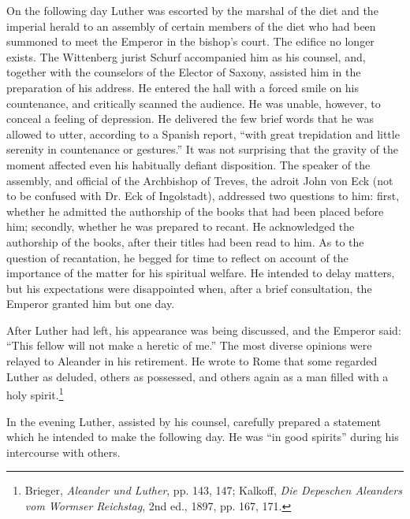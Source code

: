 On the following day Luther was escorted by the marshal of the
diet and the imperial herald to an assembly of certain members of
the diet who had been summoned to meet the Emperor in the bishop’s
court. The edifice no longer exists. The Wittenberg jurist Schurf
accompanied him as his counsel, and, together with the counselors
of the Elector of Saxony, assisted him in the preparation of his address.
He entered the hall with a forced smile on his countenance,
and critically scanned the audience. He was unable, however, to
conceal a feeling of depression. He delivered the few brief words
that he was allowed to utter, according to a Spanish report, “with
great trepidation and little serenity in countenance or gestures.”
It was not surprising that the gravity of the moment affected even
his habitually defiant disposition. The speaker of the assembly, and
official of the Archbishop of Treves, the adroit John von Eck (not
to be confused with Dr. Eck of Ingolstadt), addressed two questions to
him: first, whether he admitted the authorship of the books
that had been placed before him; secondly, whether he was prepared to recant.
He acknowledged the authorship of the books, after
their titles had been read to him. As to the question of recantation,
he begged for time to reflect on account of the importance of the
matter for his spiritual welfare. He intended to delay matters, but
his expectations were disappointed when, after a brief consultation,
the Emperor granted him but one day.

After Luther had left, his appearance was being discussed, and the
Emperor said: “This fellow will not make a heretic of me.” The most
diverse opinions were relayed to Aleander in his retirement. He
wrote to Rome that some regarded Luther as deluded, others as
possessed, and others again as a man filled with a holy spirit.\footnote
{Brieger, \textit{Aleander und Luther}, pp. 143, 147; Kalkoff, \textit{Die Depeschen Aleanders vom
Wormser Reichstag}, 2nd ed., 1897, pp. 167, 171.}

In the evening Luther, assisted by his counsel, carefully prepared
a statement which he intended to make the following day. He was
“in good spirits” during his intercourse with others.


